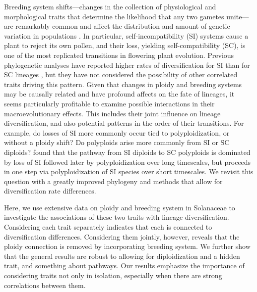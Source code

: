 Breeding system shifts---changes in the collection of physiological and morphological traits that determine the likelihood that any two gametes unite---are remarkably common and affect the distribution and amount of genetic variation in populations \citep{stebbins1974, barrett2013}.
In particular, self-incompatibility (SI) systems cause a plant to reject its own pollen, and their loss, yielding self-compatibility (SC), is one of the most replicated transitions in flowering plant evolution. %
Previous phylogenetic analyses have reported higher rates of diversification for SI than for SC lineages \citep{goldberg_2010, devos2014}, but they have not considered the possibility of other correlated traits driving this pattern.
Given that changes in ploidy and breeding systems may be causally related and have profound affects on the fate of lineages, it seems particularly profitable to examine possible interactions in their macroevolutionary effects.
This includes their joint influence on lineage diversification, and also potential patterns in the order of their transitions.
For example, do losses of SI more commonly occur tied to polyploidization, or without a ploidy shift?
Do polyploids arise more commonly from SI or SC diploids?
 found that the pathway from SI diploids to SC polyploids is dominated by loss of SI followed later by polyploidization over long timescales, but proceeds in one step via polyploidization of SI species over short timescales.
We revisit this question with a greatly improved phylogeny and methods that allow for diversification rate differences. %


Here, we use extensive data on ploidy and breeding system in Solanaceae to investigate the associations of these two traits with lineage diversification.
Considering each trait separately indicates that each is connected to diversification differences.
Considering them jointly, however, reveals that the ploidy connection is removed by incorporating breeding system.
We further show that the general results are robust to allowing for diploidization and a hidden trait, and something about pathways. %
Our results emphasize the importance of considering traits not only in isolation, especially when there are strong correlations between them.
